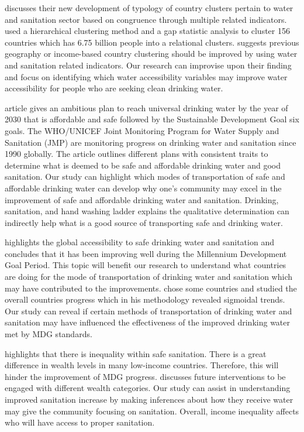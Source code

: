 \documentclass[10pt,twoside]{article}
\numberwithin{equation}{section}
\newcommand{\?}{\stackrel{?}{=}}
\begin{document}
\citet{onda2014country} discusses their new development of typology of country clusters pertain to water and sanitation
sector based on congruence through multiple related indicators. \citet{onda2014country} used a hierarchical clustering
method and a gap statistic analysis to cluster 156 countries which has 6.75 billion people into a relational
clusters. \citet{onda2014country} suggests previous geography or income-based country clustering should be improved by
using water and sanitation related indicators. Our research can improvise upon their finding and focus on identifying
which water accessibility variables may improve water accessibility for people who are seeking clean drinking water.

\citet{WHOdrinkingwater} article gives an ambitious plan to reach universal drinking water by the year of 2030 that is
affordable and safe followed by the Sustainable Development Goal six goals. The WHO/UNICEF Joint Monitoring Program for
Water Supply and Sanitation (JMP) are monitoring progress on drinking water and sanitation since 1990 globally. The
article outlines different plans with consistent traits to determine what is deemed to be safe and affordable drinking
water and good sanitation. Our study can highlight which modes of transportation of safe and affordable drinking water
can develop why one's community may excel in the improvement of safe and affordable drinking water and
sanitation. Drinking, sanitation, and hand washing ladder explains the qualitative determination can indirectly help
what is a good source of transporting safe and drinking water.

\citet{fuller2016tracking} highlights the global accessibility to safe drinking water and sanitation and concludes that
it has been improving well during the Millennium Development Goal Period. This topic will benefit our research to
understand what countries are doing for the mode of transportation of drinking water and sanitation which may have
contributed to the improvements. \citet{fuller2016tracking} chose some countries and studied the overall countries
progress which in his methodology revealed sigmoidal trends. Our study can reveal if certain methods of transportation
of drinking water and sanitation may have influenced the effectiveness of the improved drinking water met by MDG
standards.

\citet{jia2016highresolution} highlights that there is inequality within safe sanitation. There is a great difference in
wealth levels in many low-income countries. Therefore, this will hinder the improvement of MDG
progress. \citet{jia2016highresolution}discusses future interventions to be engaged with different wealth
categories. Our study can assist in understanding improved sanitation increase by making inferences about how they
receive water may give the community focusing on sanitation. Overall, income inequality affects who will have access to
proper sanitation.
\end{document}
